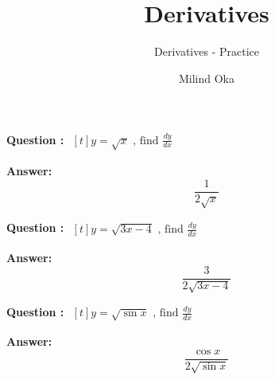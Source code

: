 \documentclass{beamer}
\title{Derivatives}
\subtitle{Derivatives - Practice}
\author{Milind Oka}
\begin{document}
 

\frame {
		\titlepage
	}

\huge

\frame
{
\textbf{Question :} 
$\begin{aligned}[t] 
y= \sqrt{x}  \text{\ , \  \ find \ \  } \frac{dy}{dx}
\end{aligned}$

}



\frame
{
\textbf{Answer:}
\begin{equation} \nonumber
\frac{1}{2\sqrt{x}}
\end{equation}

}


\frame
{
\textbf{Question :} 
$\begin{aligned}[t] 
y= \sqrt{3x-4}  \text{\ , \  \ find \ \  } \frac{dy}{dx}
\end{aligned}$
}


\frame
{
\textbf{Answer:}
\begin{equation} \nonumber
\frac{3}{2\sqrt{3x-4}}
\end{equation}

}
\frame
{
\textbf{Question :} 
$\begin{aligned}[t] 
y= \sqrt{\sin x}  \text{\ , \  \ find \ \  } \frac{dy}{dx}
\end{aligned}$
}


\frame
{
\textbf{Answer:}
\begin{equation} \nonumber
\frac{\cos x}{2\sqrt{\sin x}}
\end{equation}

}

\end{document}
